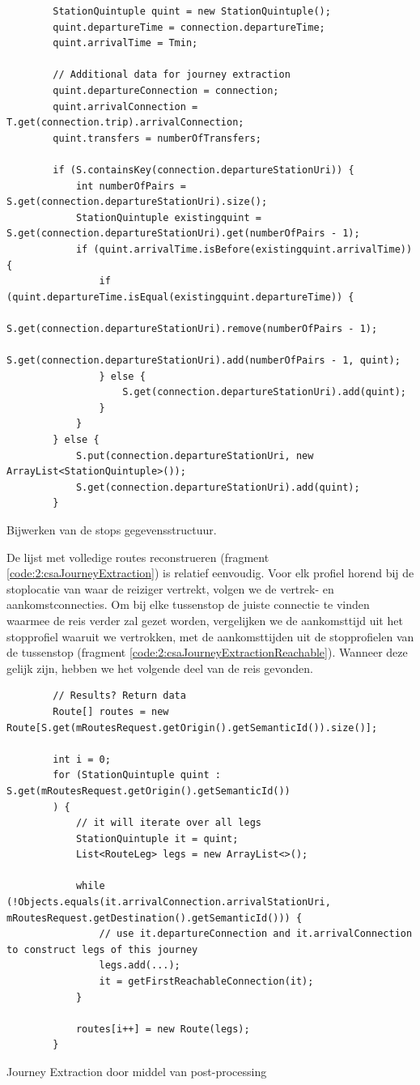 \begin{code}[h]
	\begin{verbatim}
		StationQuintuple quint = new StationQuintuple();
		quint.departureTime = connection.departureTime;
		quint.arrivalTime = Tmin;
		
		// Additional data for journey extraction
		quint.departureConnection = connection;
		quint.arrivalConnection = T.get(connection.trip).arrivalConnection;
		quint.transfers = numberOfTransfers;
		
		if (S.containsKey(connection.departureStationUri)) {
			int numberOfPairs = S.get(connection.departureStationUri).size();
			StationQuintuple existingquint = S.get(connection.departureStationUri).get(numberOfPairs - 1);
			if (quint.arrivalTime.isBefore(existingquint.arrivalTime)) {
				if (quint.departureTime.isEqual(existingquint.departureTime)) {
					S.get(connection.departureStationUri).remove(numberOfPairs - 1);
					S.get(connection.departureStationUri).add(numberOfPairs - 1, quint);
				} else {
					S.get(connection.departureStationUri).add(quint);
				}
			}
		} else {
			S.put(connection.departureStationUri, new ArrayList<StationQuintuple>());
			S.get(connection.departureStationUri).add(quint);
		}
	\end{verbatim}
	\caption[CSA: Bijwerken S]{Bijwerken van de stops gegevensstructuur.}
	\label{code:2:csaS}
\end{code}
De lijst met volledige routes reconstrueren (fragment \ref{code:2:csaJourneyExtraction}) is relatief eenvoudig. Voor elk profiel horend bij de stoplocatie van waar de reiziger vertrekt, volgen we de vertrek- en aankomstconnecties. Om bij elke tussenstop de juiste connectie te vinden waarmee de reis verder zal gezet worden, vergelijken we de aankomsttijd uit het stopprofiel waaruit we vertrokken, met de aankomsttijden uit de stopprofielen van de tussenstop (fragment \ref{code:2:csaJourneyExtractionReachable}). Wanneer deze gelijk zijn, hebben we het volgende deel van de reis gevonden.
\begin{code}[h]
	\begin{verbatim}
		// Results? Return data
		Route[] routes = new Route[S.get(mRoutesRequest.getOrigin().getSemanticId()).size()];
		
		int i = 0;
		for (StationQuintuple quint : S.get(mRoutesRequest.getOrigin().getSemanticId())
		) {
			// it will iterate over all legs
			StationQuintuple it = quint;
			List<RouteLeg> legs = new ArrayList<>();
			
			while (!Objects.equals(it.arrivalConnection.arrivalStationUri, mRoutesRequest.getDestination().getSemanticId())) {
				// use it.departureConnection and it.arrivalConnection to construct legs of this journey
				legs.add(...);
				it = getFirstReachableConnection(it);
			}
			
			routes[i++] = new Route(legs);
		}
	\end{verbatim}
	\caption[CSA: Journey extraction]{Journey Extraction door middel van post-processing}
	\label{code:2:csaJourneyExtraction}
\end{code}
